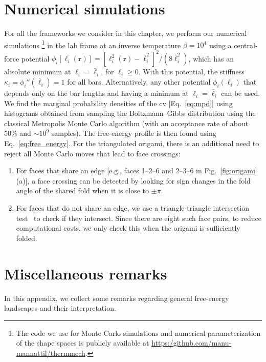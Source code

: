 \begin{subappendices}

\section{Numerical simulations}
\label{sec:numerics}

For all the frameworks we consider in this chapter, we perform our numerical simulations%
\footnote{The code we use for Monte Carlo simulations and numerical parameterization of the shape spaces is publicly available at \url{https:/github.com/manu-mannattil/thermmech}.}
in the lab frame at an inverse temperature $\beta = 10^{4}$ using a central-force potential $\phi_i[\ell_i(\bm{r})] = [\ell_i^{2}(\bm{r}) - \bar{\ell}_i^2]^2/(8\bar{\ell}_i^2)$, which has an absolute minimum at $\ell_i = \bar{\ell}_i$, for $\ell_i \geq 0$.
With this potential, the stiffness $\kappa_{i} = \phi_i''(\bar{\ell}_i) = 1$ for all bars.
Alternatively, any other potential $\phi_{i}(\ell_{i})$ that depends only on the bar lengths and having a minimum at $\ell_{i} = \bar{\ell}_{i}$ can be used.
We find the marginal probability densities of the \ac{cv} [Eq.~\eqref{eq:mpd}] using histograms obtained from sampling the Boltzmann--Gibbs distribution using the classical Metropolis Monte Carlo algorithm (with an acceptance rate of about 50\% and $\sim 10^{9}$ samples).
The free-energy profile is then found using Eq.~\eqref{eq:free_energy}.
For the triangulated origami, there is an additional need to reject all Monte Carlo moves that lead to face crossings:
%
\begin{enumerate}
  \item For faces that share an edge [e.g., faces 1--2--6 and 2--3--6 in Fig.~\ref{fig:origami}(a)], a face crossing can be detected by looking for sign changes in the fold angle of the shared fold when it is close to $\pm \pi$.
  \item For faces that do not share an edge, we use a triangle-triangle intersection test~\cite{tropp2006} to check if they intersect.
    Since there are eight such face pairs, to reduce computational costs, we only check this when the origami is sufficiently folded.
\end{enumerate}

\section{Miscellaneous remarks}

In this appendix, we collect some remarks regarding general free-energy landscapes and their interpretation.


\end{subappendices}
